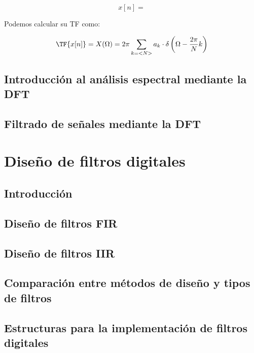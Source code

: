 \documentclass[a4paper]{book}
\begin{document}
\[ x[n] = \]

Podemos calcular su TF como:

\[ \TF{x[n]} = X(\Omega ) = 2\pi \sum_{k=<N>}a_k \cdot \delta \left( \Omega - \frac{2\pi}{N}k \right)\]

\section{Introducción al análisis espectral mediante la DFT}

\section{Filtrado de señales mediante la DFT}


\chapter{Diseño de filtros digitales}

\section{Introducción}

\section{Diseño de filtros FIR}

\section{Diseño de filtros IIR}

\section{Comparación entre métodos de diseño y tipos de filtros}

\section{Estructuras para la implementación de filtros digitales}



%
\end{document}
